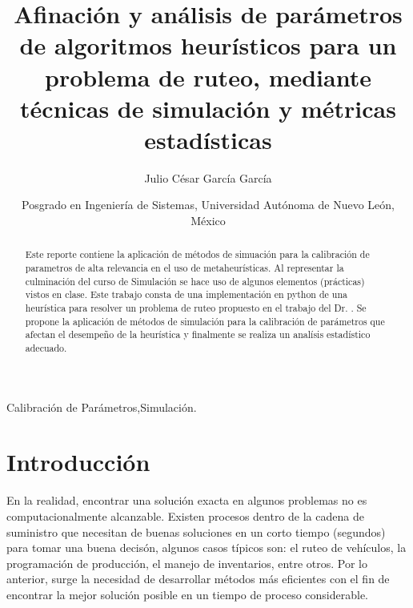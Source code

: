 \documentclass[review]{elsarticle}
\begin{document}
\begin{frontmatter}

\title{Afinaci\'on y an\'alisis de par\'ametros de algoritmos heur\'isticos para un problema de ruteo, mediante t\'ecnicas de simulaci\'on y m\'etricas estad\'isticas }


\author{Julio César Garc\'ia Garc\'ia}
\address{Monterrey, M\'exico}

\author[mymainaddress]{Posgrado en Ingeniería de Sistemas, Universidad Aut\'onoma de Nuevo Le\'on, M\'exico }



\begin{abstract}
Este reporte contiene la aplicación de métodos de simuación para la calibración de parametros de alta relevancia en el uso de metaheurísticas. Al representar la culminación del curso de Simulación se hace uso de algunos elementos (prácticas) vistos en clase. Este trabajo consta de una implementación en python de una heurística para resolver un problema de ruteo propuesto en el trabajo del Dr. \cite{angelbello2013}. Se propone la aplicación de métodos de simulación para la calibración de parámetros que afectan el desempeño de la heurística y finalmente se realiza un analísis estadístico adecuado.
\end{abstract}

\begin{keyword}
Calibración de Parámetros\sep Simulación. 
\end{keyword}

\end{frontmatter}

\linenumbers


\section{Introducci\'on}

En la realidad, encontrar una soluci\'on exacta en algunos problemas no es computacionalmente alcanzable. Existen procesos dentro de la cadena de suministro que necesitan de buenas soluciones en un corto tiempo (segundos) para tomar una buena decisón, algunos casos t\'ipicos son: el ruteo de veh\'iculos, la programaci\'on de producci\'on, el manejo de inventarios, entre otros. Por lo anterior, surge la necesidad de desarrollar m\'etodos m\'as eficientes con el fin de encontrar la mejor soluci\'on posible en un tiempo de proceso considerable.
\end{document}
